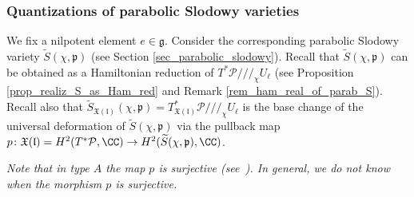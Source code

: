 \documentclass[12pt]{amsart}
\begin{document}
	\subsubsection{Quantizations of parabolic Slodowy varieties}\label{quant_slod_var}
    We fix a nilpotent element $e \in \mathfrak{g}$.
	Consider the corresponding parabolic Slodowy variety $\widetilde{S}(\chi,\mathfrak{p})$ (see Section \ref{sec_parabolic_slodowy}).
	Recall that $\widetilde{S}(\chi,\mathfrak{p})$ can be obtained as a Hamiltonian reduction of $T^*\mathcal{P}/\!/\!/_\chi U_\ell$ (see Proposition \ref{prop_realiz_S_as_Ham_red} and Remark \ref{rem_ham_real_of_parab_S}).
    Recall also that $\widetilde{S}_{\mathfrak{X}(\mathfrak{l})}(\chi,\mathfrak{p})=T^*_{\mathfrak{X}(\mathfrak{l})}\mathcal{P}/\!/\!/_\chi U_\ell$ is the base change of the universal deformation of $\widetilde{S}(\chi,\mathfrak{p})$ via the pullback map $p\colon \mathfrak{X}(\mathfrak{l})=H^2(T^*\mathcal{P},\CC) \rightarrow H^2(\widetilde{S}(\chi,\mathfrak{p}),\CC)$.




 \begin{rmk}\label{map_cohom}%
	{\em{Note that in type $A$ the map $p$ is surjective ({\em{see}}~\cite[Section 2]{bo}). In general, we do not know when the morphism $p$ is surjective.}}   
	\end{rmk}  
\end{document}
